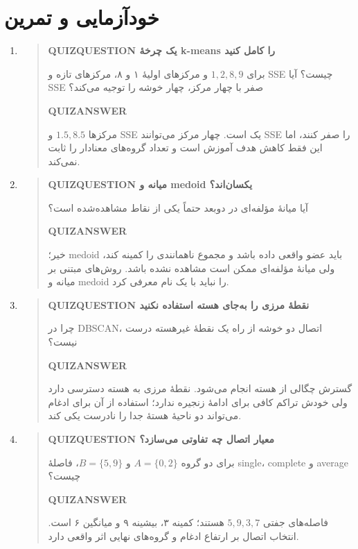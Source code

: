 \section{خودآزمایی و تمرین}
\begin{enumerate}
\item\begin{quote}\textbf{QUIZQUESTION یک چرخهٔ k-means را کامل کنید}\par 
برای $1,2,8,9$ و مرکزهای اولیهٔ ۱ و ۸، مرکزهای تازه و SSE چیست؟ آیا SSE صفر با چهار مرکز، چهار خوشه را توجیه می‌کند؟
\par\textbf{QUIZANSWER}\par مرکزها $1.5,8.5$ و SSE یک است. چهار مرکز می‌توانند SSE را صفر کنند، اما این فقط کاهش هدف آموزش است و تعداد گروه‌های معنادار را ثابت نمی‌کند.\par 
\end{quote}
\item\begin{quote}\textbf{QUIZQUESTION میانه و medoid یکسان‌اند؟}\par 
آیا میانهٔ مؤلفه‌ای در دوبعد حتماً یکی از نقاط مشاهده‌شده است؟
\par\textbf{QUIZANSWER}\par خیر؛ medoid باید عضو واقعی داده باشد و مجموع ناهمانندی را کمینه کند، ولی میانهٔ مؤلفه‌ای ممکن است مشاهده نشده باشد. روش‌های مبتنی بر میانه و medoid را نباید با یک نام معرفی کرد.\par 
\end{quote}
\item\begin{quote}\textbf{QUIZQUESTION نقطهٔ مرزی را به‌جای هسته استفاده نکنید}\par 
چرا در DBSCAN، اتصال دو خوشه از راه یک نقطهٔ غیرهسته درست نیست؟
\par\textbf{QUIZANSWER}\par گسترش چگالی از هسته انجام می‌شود. نقطهٔ مرزی به هسته دسترسی دارد ولی خودش تراکم کافی برای ادامهٔ زنجیره ندارد؛ استفاده از آن برای ادغام می‌تواند دو ناحیهٔ هستهٔ جدا را نادرست یکی کند.\par 
\end{quote}
\item\begin{quote}\textbf{QUIZQUESTION معیار اتصال چه تفاوتی می‌سازد؟}\par 
برای دو گروه $A=\{0,2\}$ و $B=\{5,9\}$، فاصلهٔ single، complete و average چیست؟
\par\textbf{QUIZANSWER}\par فاصله‌های جفتی $5,9,3,7$ هستند؛ کمینه ۳، بیشینه ۹ و میانگین ۶ است. انتخاب اتصال بر ارتفاع ادغام و گروه‌های نهایی اثر واقعی دارد.\par 

\end{quote}
\end{enumerate}
